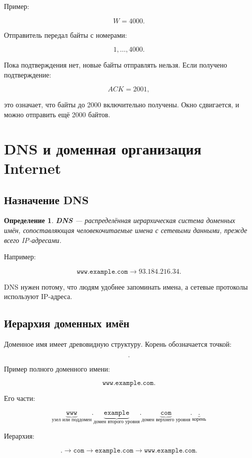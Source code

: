 \documentclass[12pt,a4paper]{article}
\newtheorem{definition}{Определение}
\begin{document}
Пример:

\[
W=4000.
\]

Отправитель передал байты с номерами:

\[
1,\ldots,4000.
\]

Пока подтверждения нет, новые байты отправлять нельзя. Если получено подтверждение:

\[
ACK=2001,
\]

это означает, что байты до 2000 включительно получены. Окно сдвигается, и можно отправить ещё 2000 байтов.

\section{DNS и доменная организация Internet}

\subsection{Назначение DNS}

\begin{definition}
\textbf{DNS} --- распределённая иерархическая система доменных имён, сопоставляющая человекочитаемые имена с сетевыми данными, прежде всего IP-адресами.
\end{definition}

Например:

\[
\texttt{www.example.com} \rightarrow 93.184.216.34.
\]

DNS нужен потому, что людям удобнее запоминать имена, а сетевые протоколы используют IP-адреса.

\subsection{Иерархия доменных имён}

Доменное имя имеет древовидную структуру. Корень обозначается точкой:

\[
.
\]

Пример полного доменного имени:

\[
\texttt{www.example.com.}
\]

Его части:

\[
\underbrace{\texttt{www}}_{\text{узел или поддомен}}.
\underbrace{\texttt{example}}_{\text{домен второго уровня}}.
\underbrace{\texttt{com}}_{\text{домен верхнего уровня}}.
\underbrace{\texttt{.}}_{\text{корень}}
\]

Иерархия:

\[
\texttt{.}
\rightarrow
\texttt{com}
\rightarrow
\texttt{example.com}
\rightarrow
\texttt{www.example.com}.
\]
\end{document}
